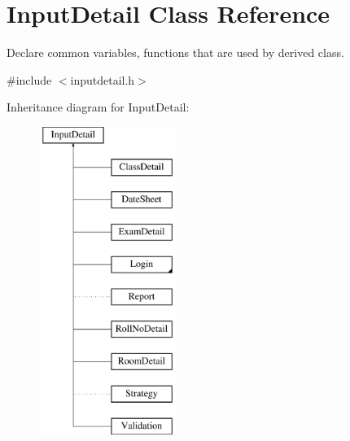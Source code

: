 \hypertarget{classInputDetail}{\section{Input\-Detail Class Reference}
\label{classInputDetail}
}


Declare common variables, functions that are used by derived class.  




{\ttfamily \#include $<$inputdetail.\-h$>$}

Inheritance diagram for Input\-Detail\-:\begin{figure}[H]
\begin{center}
\leavevmode
\includegraphics[height=10.000000cm]{classInputDetail}
\end{center}
\end{figure}
